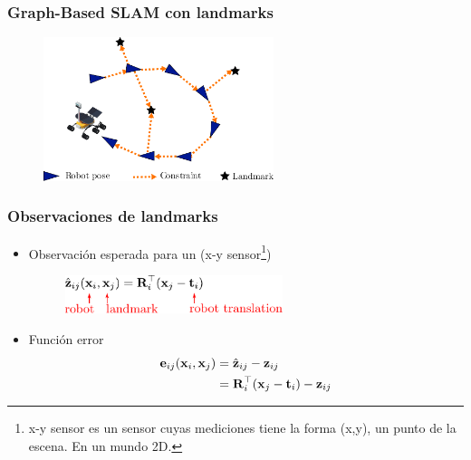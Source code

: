 \begin{frame}
    \frametitle{Graph-Based SLAM con landmarks}
    
       \begin{figure}[!h]
        \includegraphics[width=0.6\textwidth]{images/pose_landmark_graph_example.pdf}
    \end{figure}
    
\end{frame}

\begin{frame}
    \frametitle{Observaciones de landmarks}
    
    \begin{itemize}
        \item Observación esperada para un (x-y sensor\footnote{x-y sensor es un sensor cuyas mediciones tiene la forma (x,y), un punto de la escena. En un mundo 2D.})
           \begin{figure}[!h]
            \includegraphics[width=0.6\textwidth]{images/pose_landmark_graph_expected_observation.pdf}
        \end{figure}
    \item Función error
    \begin{align*}
        \boldsymbol{\mathbf{e}}_{ij}(\boldsymbol{\mathbf{x}}_{i}, \boldsymbol{\mathbf{x}}_{j}) &= \hat{\boldsymbol{\mathbf{z}}}_{ij} - \boldsymbol{\mathbf{z}}_{ij}\\
                    &= \boldsymbol{\mathbf{R}}_{i}^{\top}(\boldsymbol{\mathbf{x}}_{j}-\boldsymbol{\mathbf{t}}_{i}) - \boldsymbol{\mathbf{z}}_{ij}
    \end{align*}
    \end{itemize}
    
\end{frame}

